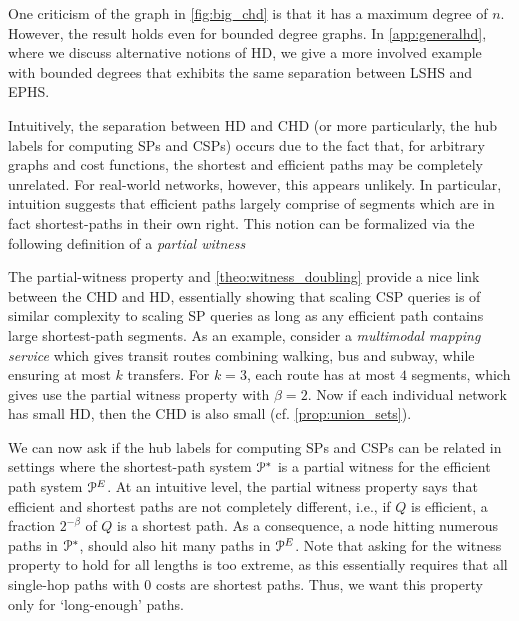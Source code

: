\begin{remark}
One criticism of the graph in \cref{fig:big_chd} is that it has a maximum degree of $n$.
However, the result holds even for bounded degree graphs.
In \cref{app:generalhd}, where we discuss alternative notions of HD, we give a more involved example with bounded degrees that exhibits the same separation between LSHS and EPHS.
\end{remark}

Intuitively, the separation between HD and CHD (or more particularly, the hub labels for computing SPs and CSPs) occurs due to the fact that, for arbitrary graphs and cost functions, the shortest and efficient paths may be completely unrelated. 
For real-world networks, however, this appears unlikely.
In particular, intuition suggests that efficient paths largely comprise of segments which are in fact shortest-paths in their own right. 
This notion can be formalized via the following definition of a \emph{partial witness} 

The partial-witness property and \cref{theo:witness_doubling} provide a nice link between the CHD and HD, essentially showing that scaling CSP queries is of similar complexity to scaling SP queries as long as any efficient path contains large shortest-path segments. 
As an example, consider a \emph{multimodal mapping service} which gives transit routes combining walking, bus and subway, while ensuring at most $k$ transfers. 
For $k=3$, each route has at most $4$ segments, which gives use the partial witness property with $\beta = 2$. 
Now if each individual network has small HD, then the CHD is also small (cf. \cref{prop:union_sets}).

We can now ask if the hub labels for computing SPs and CSPs can be related in settings where the shortest-path system $\mathcal{P}^*$ is a partial witness for the efficient path system $\mathcal{P}^E$.
At an intuitive level, the partial witness property says that efficient and shortest paths are not completely different, i.e., if $Q$ is efficient, a fraction $2^{-\beta}$ of $Q$ is a shortest path.
As a consequence, a node hitting numerous paths in $\mathcal{P}^*$, should also hit many paths in $\mathcal{P}^E$.
Note that asking for the witness property to hold for all lengths is too extreme, as this essentially requires that all single-hop paths with 0 costs are shortest paths.
Thus, we want this property only for `long-enough' paths. 

